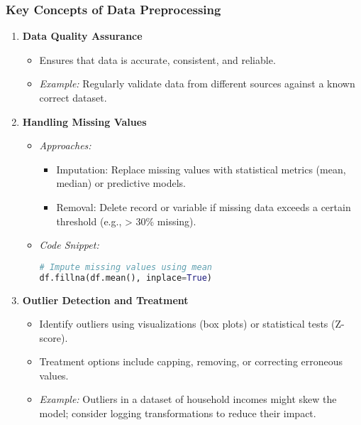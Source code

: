 \documentclass[aspectratio=169]{beamer}
\begin{document}
\begin{frame}[fragile]
    \frametitle{Key Concepts of Data Preprocessing}
    \begin{enumerate}
        \item \textbf{Data Quality Assurance}
            \begin{itemize}
                \item Ensures that data is accurate, consistent, and reliable.
                \item \textit{Example:} Regularly validate data from different sources against a known correct dataset.
            \end{itemize}
        
        \item \textbf{Handling Missing Values}
            \begin{itemize}
                \item \textit{Approaches:}
                    \begin{itemize}
                        \item Imputation: Replace missing values with statistical metrics (mean, median) or predictive models.
                        \item Removal: Delete record or variable if missing data exceeds a certain threshold (e.g., > 30\% missing).
                    \end{itemize}
                \item \textit{Code Snippet:}
                \begin{lstlisting}[language=Python]
# Impute missing values using mean
df.fillna(df.mean(), inplace=True)
                \end{lstlisting}
            \end{itemize}

        \item \textbf{Outlier Detection and Treatment}
            \begin{itemize}
                \item Identify outliers using visualizations (box plots) or statistical tests (Z-score).
                \item Treatment options include capping, removing, or correcting erroneous values.
                \item \textit{Example:} Outliers in a dataset of household incomes might skew the model; consider logging transformations to reduce their impact.
            \end{itemize}
    \end{enumerate}
\end{frame}
\end{document}

